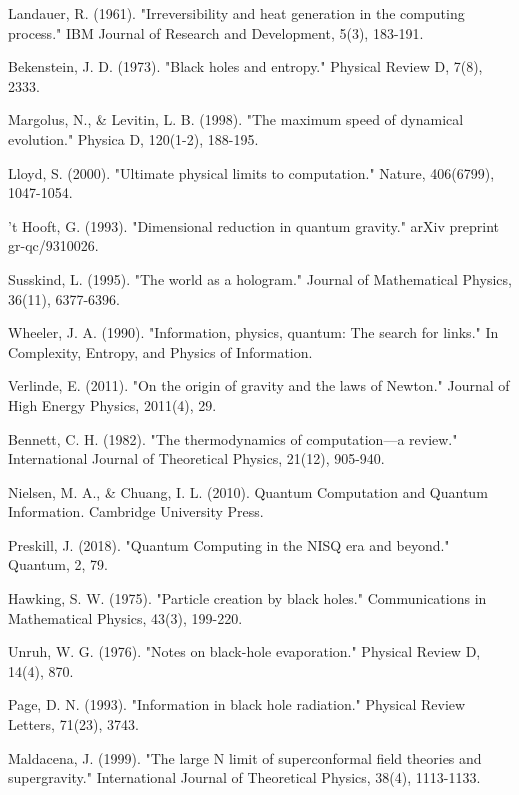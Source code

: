 \documentclass[11pt,a4paper]{article}
\theoremstyle{definition}
\begin{document}
\begin{thebibliography}{99}

 Landauer, R. (1961). "Irreversibility and heat generation in the computing process." IBM Journal of Research and Development, 5(3), 183-191.

 Bekenstein, J. D. (1973). "Black holes and entropy." Physical Review D, 7(8), 2333.

 Margolus, N., \& Levitin, L. B. (1998). "The maximum speed of dynamical evolution." Physica D, 120(1-2), 188-195.

 Lloyd, S. (2000). "Ultimate physical limits to computation." Nature, 406(6799), 1047-1054.

 't Hooft, G. (1993). "Dimensional reduction in quantum gravity." arXiv preprint gr-qc/9310026.

 Susskind, L. (1995). "The world as a hologram." Journal of Mathematical Physics, 36(11), 6377-6396.

 Wheeler, J. A. (1990). "Information, physics, quantum: The search for links." In Complexity, Entropy, and Physics of Information.

 Verlinde, E. (2011). "On the origin of gravity and the laws of Newton." Journal of High Energy Physics, 2011(4), 29.

 Bennett, C. H. (1982). "The thermodynamics of computation—a review." International Journal of Theoretical Physics, 21(12), 905-940.

 Nielsen, M. A., \& Chuang, I. L. (2010). Quantum Computation and Quantum Information. Cambridge University Press.

 Preskill, J. (2018). "Quantum Computing in the NISQ era and beyond." Quantum, 2, 79.

 Hawking, S. W. (1975). "Particle creation by black holes." Communications in Mathematical Physics, 43(3), 199-220.

 Unruh, W. G. (1976). "Notes on black-hole evaporation." Physical Review D, 14(4), 870.

 Page, D. N. (1993). "Information in black hole radiation." Physical Review Letters, 71(23), 3743.

 Maldacena, J. (1999). "The large N limit of superconformal field theories and supergravity." International Journal of Theoretical Physics, 38(4), 1113-1133.


\end{thebibliography}
\end{document}
